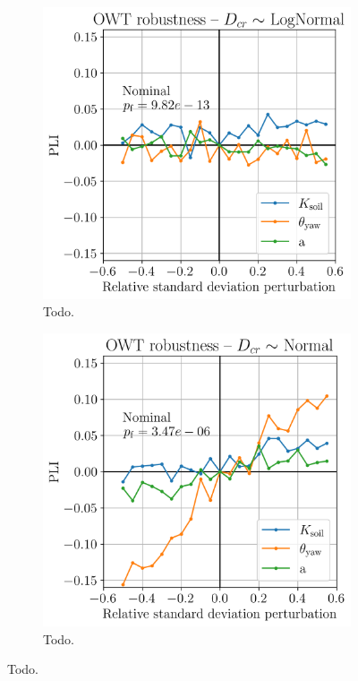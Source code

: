 \begin{figure}
    \centering
    \begin{subfigure}[t]{0.48\linewidth}
        \includegraphics[width=\linewidth]{./part3/figures/OWT/PLI_ALL_Hyp_LogNormal.png}
        \caption{Todo.}
    \end{subfigure}
    \begin{subfigure}[t]{0.48\linewidth}
        \includegraphics[width=\linewidth]{./part3/figures/OWT/PLI_ALL_Hyp_Normal.png}
        \caption{Todo.}
    \end{subfigure}
    \label{fig:pli_all}
    \caption{Todo.}
\end{figure}


